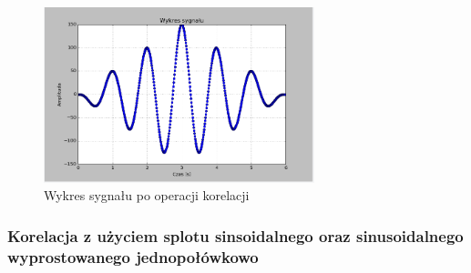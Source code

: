 \documentclass{article}
\begin{document}
{{    \begin{figure}[h!]
        \centering
        \includegraphics[width=0.7\textwidth]{img/kor_bez_1.png}
        \caption{Wykres sygnału po operacji korelacji}
    \end{figure}
    }
    \FloatBarrier
    \subsubsection{Korelacja z użyciem splotu sinsoidalnego oraz sinusoidalnego wyprostowanego
    jednopołówkowo} \label{eksperyment:korelacja5}{

}}
\end{document}
